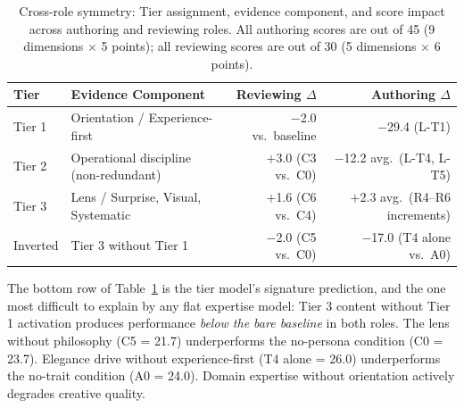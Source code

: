 \begin{table}[t]
\centering
\caption{Cross-role symmetry: Tier assignment, evidence component, and score impact
across authoring and reviewing roles. All authoring scores are out of 45 (9 dimensions
$\times$ 5 points); all reviewing scores are out of 30 (5 dimensions $\times$ 6 points).}
\label{tab:symmetry}
\begin{tabular}{llrr}
\toprule
\textbf{Tier} & \textbf{Evidence Component} & \textbf{Reviewing $\Delta$} & \textbf{Authoring $\Delta$} \\
\midrule
Tier 1 & Orientation / Experience-first & $-$2.0 vs.\ baseline & $-$29.4 (L-T1) \\
Tier 2 & Operational discipline (non-redundant) & $+$3.0 (C3 vs.\ C0) & $-$12.2 avg.\ (L-T4, L-T5) \\
Tier 3 & Lens / Surprise, Visual, Systematic & $+$1.6 (C6 vs.\ C4) & $+$2.3 avg.\ (R4--R6 increments) \\
\midrule
Inverted & Tier 3 without Tier 1 & $-$2.0 (C5 vs.\ C0) & $-$17.0 (T4 alone vs.\ A0) \\
\bottomrule
\end{tabular}
\end{table}

The bottom row of Table~\ref{tab:symmetry} is the tier model's signature prediction, and
the one most difficult to explain by any flat expertise model: Tier 3 content without
Tier 1 activation produces performance \textit{below the bare baseline} in both roles.
The lens without philosophy (C5 = 21.7) underperforms the no-persona condition (C0 =
23.7). Elegance drive without experience-first (T4 alone = 26.0) underperforms the
no-trait condition (A0 = 24.0). Domain expertise without orientation actively degrades
creative quality.
